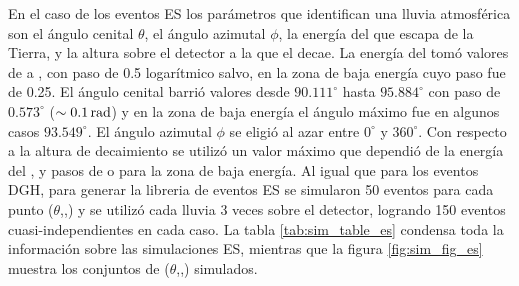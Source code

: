 		En el caso de los eventos ES los parámetros que identifican una lluvia atmosférica son el ángulo cenital $\theta$, el ángulo azimutal $\phi$, la energía \etau{} del \tauon{} que escapa de la Tierra, y la altura \xd{} sobre el detector a la que el \tauon{} decae.
		La energía del \tauon{} tom\'o valores de  a , con paso de 0.5 logarítmico salvo, en la zona de baja energía cuyo paso fue de 0.25.
		El ángulo cenital barrió valores desde $90.111^\circ$ hasta $95.884^\circ$ con paso de $0.573^\circ$ ($\sim0.1 \,\rm rad$) y en la zona de baja energía el ángulo máximo fue en algunos casos $93.549^\circ$.
		El ángulo azimutal $\phi$ se eligió al azar entre $0^\circ$ y $360^\circ$.
		Con respecto a la altura de decaimiento \xd{} se utilizó un valor máximo que dependió de la energía del \tauon, y pasos de  o  para la zona de baja energía.
		Al igual que para los eventos DGH, para generar la libreria de eventos ES se simularon 50 eventos para cada punto ($\theta$,\etau{},\xd{}) y se utilizó cada lluvia 3 veces sobre el detector, logrando 150 eventos cuasi-independientes en cada caso. 
		La tabla \ref{tab:sim_table_es} condensa toda la información sobre las simulaciones ES, mientras que la figura \ref{fig:sim_fig_es} muestra los conjuntos de ($\theta$,\etau{},\xd{}) simulados.
